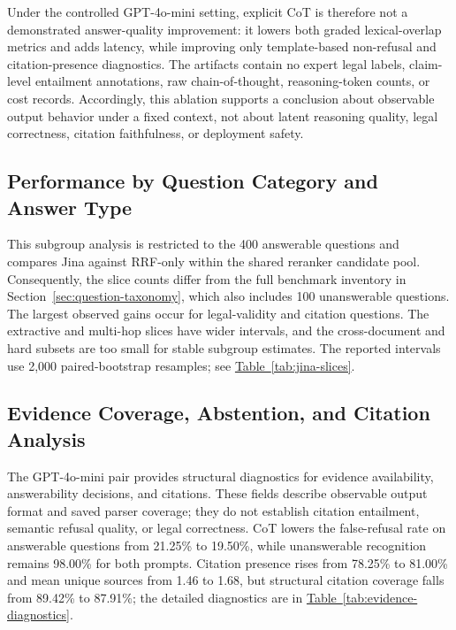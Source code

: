 Under the controlled GPT-4o-mini setting, explicit CoT is therefore not a
demonstrated answer-quality improvement: it lowers both graded lexical-overlap
metrics and adds latency, while improving only template-based non-refusal and
citation-presence diagnostics. The artifacts contain no expert legal labels,
claim-level entailment annotations, raw chain-of-thought, reasoning-token
counts, or cost records. Accordingly, this ablation supports a conclusion
about observable output behavior under a fixed context, not about latent
reasoning quality, legal correctness, citation faithfulness, or deployment
safety.

\subsection{Performance by Question Category and Answer Type}
\label{sec:breakdown-analysis}

This subgroup analysis is restricted to the 400 answerable questions and
compares Jina against RRF-only within the shared reranker candidate pool.
Consequently, the slice counts differ from the full benchmark inventory in
Section~\ref{sec:question-taxonomy}, which also includes 100 unanswerable
questions. The largest observed gains occur for legal-validity and citation
questions. The extractive and multi-hop slices have wider intervals, and the
cross-document and hard subsets are too small for stable subgroup estimates.
The reported intervals use 2,000 paired-bootstrap resamples; see
\hyperref[tab:jina-slices]{Table~\ref*{tab:jina-slices}}.

\subsection{Evidence Coverage, Abstention, and Citation Analysis}
\label{sec:evidence-analysis}

The GPT-4o-mini pair provides structural diagnostics for evidence availability,
answerability decisions, and citations. These fields describe observable
output format and saved parser coverage; they do not establish citation
entailment, semantic refusal quality, or legal correctness. CoT lowers the
false-refusal rate on answerable questions from 21.25\% to 19.50\%, while
unanswerable recognition remains 98.00\% for both prompts. Citation presence
rises from 78.25\% to 81.00\% and mean unique sources from 1.46 to 1.68, but
structural citation coverage falls from 89.42\% to 87.91\%; the detailed
diagnostics are in \hyperref[tab:evidence-diagnostics]{Table~\ref*{tab:evidence-diagnostics}}.

